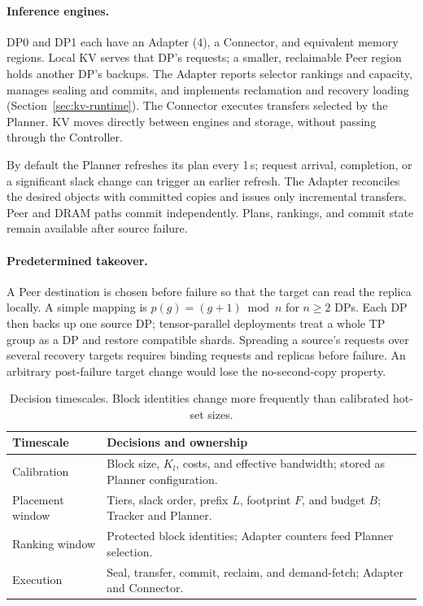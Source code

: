 \paragraph{Inference engines.}
DP0 and DP1 each have an Adapter (4), a Connector, and equivalent memory
regions. Local KV serves that DP's requests; a smaller, reclaimable Peer
region holds another DP's backups. The Adapter reports selector rankings
and capacity, manages sealing and commits, and implements reclamation and
recovery loading (Section~\ref{sec:kv-runtime}). The Connector executes
transfers selected by the Planner. KV moves directly between engines and
storage, without passing through the Controller.

By default the Planner refreshes its plan every 1\,s; request arrival,
completion, or a significant slack change can trigger an earlier refresh.
The Adapter reconciles the desired objects with committed copies and
issues only incremental transfers. Peer and DRAM paths commit independently.
Plans, rankings, and commit state remain available after source failure.

\paragraph{Predetermined takeover.}
A Peer destination is chosen before failure so that the target can read
the replica locally. A simple mapping is $p(g)=(g+1)\bmod n$ for $n\ge2$
DPs. Each DP then backs up one source DP; tensor-parallel deployments
treat a whole TP group as a DP and restore compatible shards.
Spreading a source's requests over several recovery targets requires
binding requests and replicas before failure. An arbitrary post-failure
target change would lose the no-second-copy property.

\begin{table}[t]
  \caption{Decision timescales. Block identities change more frequently
    than calibrated hot-set sizes.}
  \label{tab:design-timescales}
  \centering
  \begin{tabularx}{\columnwidth}{@{}lX@{}}
    \toprule
    Timescale & Decisions and ownership \\
    \midrule
    Calibration & Block size, $K_l$, costs, and effective bandwidth;
      stored as Planner configuration. \\
    Placement window & Tiers, slack order, prefix $L$, footprint $F$,
      and budget $B$; Tracker and Planner. \\
    Ranking window & Protected block identities; Adapter counters
      feed Planner selection. \\
    Execution & Seal, transfer, commit, reclaim, and demand-fetch;
      Adapter and Connector. \\
    \bottomrule
  \end{tabularx}
\end{table}
